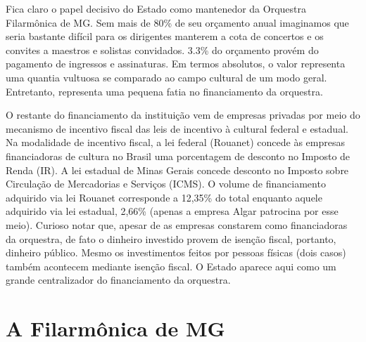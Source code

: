 \documentclass[a4paper, 12pt, openright, oneside, german, french, english, brazil]{abntex2}
\begin{document}
	Fica claro o papel decisivo do Estado como mantenedor da Orquestra Filarmônica de MG. Sem mais de 80\% de seu orçamento anual imaginamos que seria bastante difícil para os dirigentes manterem a cota de concertos e os convites a maestros e solistas convidados. 3.3\% do orçamento provém do pagamento de ingressos e assinaturas. Em termos absolutos, o valor representa uma quantia vultuosa se comparado ao campo cultural de um modo geral. Entretanto, representa uma pequena fatia no financiamento da orquestra.



	O restante do financiamento da instituição vem de empresas privadas por meio do mecanismo de incentivo fiscal das leis de incentivo à cultural federal e estadual. Na modalidade de incentivo fiscal, a lei federal (Rouanet) concede às empresas financiadoras de cultura no Brasil uma porcentagem de desconto no Imposto de Renda (IR). A lei estadual de Minas Gerais concede desconto no Imposto sobre Circulação de Mercadorias e Serviços (ICMS). O volume de financiamento adquirido via lei Rouanet corresponde a 12,35\% do total enquanto aquele adquirido via lei estadual, 2,66\% (apenas a empresa Algar patrocina por esse meio). Curioso notar que, apesar de as empresas constarem como financiadoras da orquestra, de fato o dinheiro investido provem de isenção fiscal, portanto, dinheiro público. Mesmo os investimentos feitos por pessoas físicas (dois casos) também acontecem mediante isenção fiscal. O Estado aparece aqui como um grande centralizador do financiamento da orquestra.


	
	\section{A Filarmônica de MG}
	
	
\end{document}
